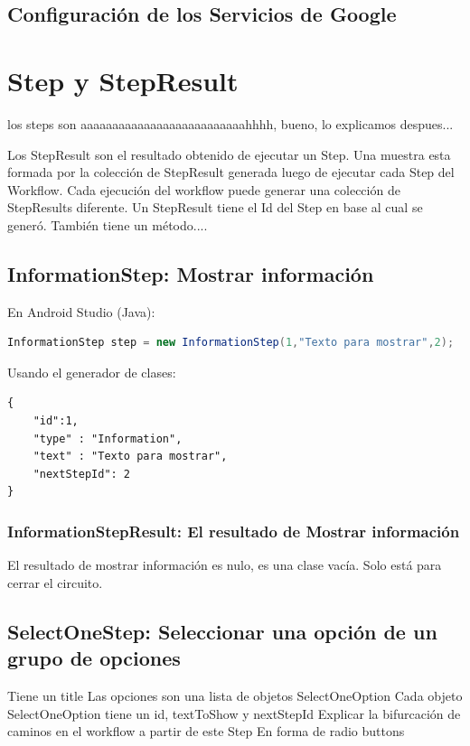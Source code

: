 \begin{itemize}
\begin{lstlisting}[language=XML, frame=tlb]
\end{lstlisting}	
	
\end{itemize}

\subsection{Configuración de los Servicios de Google}

\section{Step y StepResult}
los steps son aaaaaaaaaaaaaaaaaaaaaaaaaahhhh, bueno, lo explicamos despues...

Los StepResult son el resultado obtenido de ejecutar un Step.
Una muestra esta formada por la colección de StepResult generada luego de ejecutar cada Step del Workflow. Cada ejecución del workflow puede generar una colección de StepResults diferente.
Un StepResult tiene el Id del Step en base al cual se generó. También tiene un método....

\subsection{InformationStep: Mostrar información}

En Android Studio (Java):
\begin{lstlisting}[language=Java, frame=tlb]	
InformationStep step = new InformationStep(1,"Texto para mostrar",2);
\end{lstlisting}

Usando el generador de clases:
\begin{lstlisting}[language=XML, frame=tlb]	
{
	"id":1,
	"type" : "Information",
	"text" : "Texto para mostrar",
	"nextStepId": 2
}
\end{lstlisting}

\subsubsection{InformationStepResult: El resultado de Mostrar información}
El resultado de mostrar información es nulo, es una clase vacía. Solo está para cerrar el circuito.

\subsection{SelectOneStep: Seleccionar una opción de un grupo de opciones}
Tiene un title
Las opciones son una lista de objetos SelectOneOption
Cada objeto SelectOneOption tiene un id, textToShow y nextStepId
Explicar la bifurcación de caminos en el workflow a partir de este Step
En forma de radio buttons


